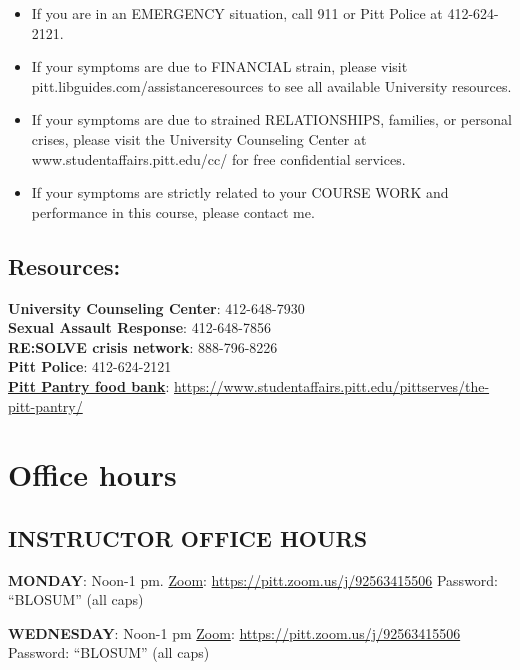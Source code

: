 \documentclass[
]{book}
\providecommand{\tightlist}{%
  \setlength{\itemsep}{0pt}\setlength{\parskip}{0pt}}
\begin{document}
\begin{itemize}
\tightlist
\item
  If you are in an EMERGENCY situation, call 911 or Pitt Police at 412-624-2121.
\item
  If your symptoms are due to FINANCIAL strain, please visit pitt.libguides.com/assistanceresources to see all available University resources.
\item
  If your symptoms are due to strained RELATIONSHIPS, families, or personal crises, please visit the University Counseling Center at www.studentaffairs.pitt.edu/cc/ for free confidential services.
\item
  If your symptoms are strictly related to your COURSE WORK and performance in this course, please contact me.
\end{itemize}

\hypertarget{resources}{%
\section{Resources:}\label{resources}}

\textbf{University Counseling Center}: 412-648-7930\\
\textbf{Sexual Assault Response}: 412-648-7856\\
\textbf{RE:SOLVE crisis network}: 888-796-8226\\
\textbf{Pitt Police}: 412-624-2121\\
\href{https://www.studentaffairs.pitt.edu/pittserves/the-pitt-pantry/}{\textbf{Pitt Pantry food bank}}: \url{https://www.studentaffairs.pitt.edu/pittserves/the-pitt-pantry/}

\hypertarget{office-hours}{%
\chapter{Office hours}\label{office-hours}}

\hypertarget{instructor-office-hours}{%
\section{INSTRUCTOR OFFICE HOURS}\label{instructor-office-hours}}

\textbf{MONDAY}: Noon-1 pm.
\href{https://pitt.zoom.us/j/92563415506}{Zoom}: \url{https://pitt.zoom.us/j/92563415506}
Password: ``BLOSUM'' (all caps)

\textbf{WEDNESDAY}: Noon-1 pm
\href{https://pitt.zoom.us/j/92563415506}{Zoom}: \url{https://pitt.zoom.us/j/92563415506}
Password: ``BLOSUM'' (all caps)
\end{document}
